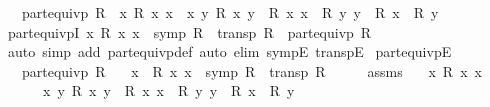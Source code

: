 \begin{isabellebody}
\ \ \ {\isachardoublequoteopen}part{\isacharunderscore}{\kern0pt}equivp\ R\ {\isasymlongleftrightarrow}\ {\isacharparenleft}{\kern0pt}{\isasymexists}x{\isachardot}{\kern0pt}\ R\ x\ x{\isacharparenright}{\kern0pt}\ {\isasymand}\ {\isacharparenleft}{\kern0pt}{\isasymforall}x\ y{\isachardot}{\kern0pt}\ R\ x\ y\ {\isasymlongleftrightarrow}\ R\ x\ x\ {\isasymand}\ R\ y\ y\ {\isasymand}\ R\ x\ {\isacharequal}{\kern0pt}\ R\ y{\isacharparenright}{\kern0pt}{\isachardoublequoteclose}\isanewline
\ \ \ \ %
\isanewline
\isanewline
{}\isamarkupfalse%
\ part{\isacharunderscore}{\kern0pt}equivpI{\isacharcolon}{\kern0pt}\ {\isachardoublequoteopen}{\isasymexists}x{\isachardot}{\kern0pt}\ R\ x\ x\ {\isasymLongrightarrow}\ symp\ R\ {\isasymLongrightarrow}\ transp\ R\ {\isasymLongrightarrow}\ part{\isacharunderscore}{\kern0pt}equivp\ R{\isachardoublequoteclose}\isanewline
%
\isadelimproof
\ \ %
\endisadelimproof
%
\isatagproof
{}\isamarkupfalse%
\ {\isacharparenleft}{\kern0pt}auto\ simp\ add{\isacharcolon}{\kern0pt}\ part{\isacharunderscore}{\kern0pt}equivp{\isacharunderscore}{\kern0pt}def{\isacharparenright}{\kern0pt}\ {\isacharparenleft}{\kern0pt}auto\ elim{\isacharcolon}{\kern0pt}\ sympE\ transpE{\isacharparenright}{\kern0pt}%
\endisatagproof
{\isafoldproof}%
%
\isadelimproof
\isanewline
%
\endisadelimproof
\isanewline
{}\isamarkupfalse%
\ part{\isacharunderscore}{\kern0pt}equivpE{\isacharcolon}{\kern0pt}\isanewline
\ \ \ {\isachardoublequoteopen}part{\isacharunderscore}{\kern0pt}equivp\ R{\isachardoublequoteclose}\isanewline
\ \ \ x\ \ {\isachardoublequoteopen}R\ x\ x{\isachardoublequoteclose}\ \ {\isachardoublequoteopen}symp\ R{\isachardoublequoteclose}\ \ {\isachardoublequoteopen}transp\ R{\isachardoublequoteclose}\isanewline
%
\isadelimproof
%
\endisadelimproof
%
\isatagproof
{}\isamarkupfalse%
\ {\isacharminus}{\kern0pt}\isanewline
\ \ \isamarkupfalse%
\ assms\ \isamarkupfalse%
\ {}{\isacharcolon}{\kern0pt}\ {\isachardoublequoteopen}{\isasymexists}x{\isachardot}{\kern0pt}\ R\ x\ x{\isachardoublequoteclose}\isanewline
\ \ \ \ \ {}{\isacharcolon}{\kern0pt}\ {\isachardoublequoteopen}{\isasymAnd}x\ y{\isachardot}{\kern0pt}\ R\ x\ y\ {\isasymlongleftrightarrow}\ R\ x\ x\ {\isasymand}\ R\ y\ y\ {\isasymand}\ R\ x\ {\isacharequal}{\kern0pt}\ R\ y{\isachardoublequoteclose}\isanewline

\end{isabellebody}
